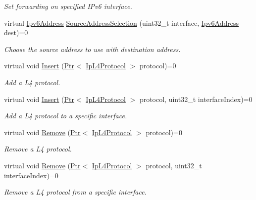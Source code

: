 \begin{DoxyCompactItemize}
\begin{DoxyCompactList}\small\item\em Set forwarding on specified I\+Pv6 interface. \end{DoxyCompactList}\item 
virtual \hyperlink{classns3_1_1Ipv6Address}{Ipv6\+Address} \hyperlink{classns3_1_1Ipv6_a07bfb23e4bee98b2a2bfb56c16908cd4}{Source\+Address\+Selection} (uint32\+\_\+t interface, \hyperlink{classns3_1_1Ipv6Address}{Ipv6\+Address} dest)=0
\begin{DoxyCompactList}\small\item\em Choose the source address to use with destination address. \end{DoxyCompactList}\item 
virtual void \hyperlink{classns3_1_1Ipv6_af696a13faee7772aa155e6b06a752220}{Insert} (\hyperlink{classns3_1_1Ptr}{Ptr}$<$ \hyperlink{classns3_1_1IpL4Protocol}{Ip\+L4\+Protocol} $>$ protocol)=0
\begin{DoxyCompactList}\small\item\em Add a L4 protocol. \end{DoxyCompactList}\item 
virtual void \hyperlink{classns3_1_1Ipv6_abac82ab5421240d8011131f0f49a080b}{Insert} (\hyperlink{classns3_1_1Ptr}{Ptr}$<$ \hyperlink{classns3_1_1IpL4Protocol}{Ip\+L4\+Protocol} $>$ protocol, uint32\+\_\+t interface\+Index)=0
\begin{DoxyCompactList}\small\item\em Add a L4 protocol to a specific interface. \end{DoxyCompactList}\item 
virtual void \hyperlink{classns3_1_1Ipv6_abb09312c165a45923cd88061a3be2c82}{Remove} (\hyperlink{classns3_1_1Ptr}{Ptr}$<$ \hyperlink{classns3_1_1IpL4Protocol}{Ip\+L4\+Protocol} $>$ protocol)=0
\begin{DoxyCompactList}\small\item\em Remove a L4 protocol. \end{DoxyCompactList}\item 
virtual void \hyperlink{classns3_1_1Ipv6_ac8f460ea4a38988cbc80b91a14e45912}{Remove} (\hyperlink{classns3_1_1Ptr}{Ptr}$<$ \hyperlink{classns3_1_1IpL4Protocol}{Ip\+L4\+Protocol} $>$ protocol, uint32\+\_\+t interface\+Index)=0
\begin{DoxyCompactList}\small\item\em Remove a L4 protocol from a specific interface. \end{DoxyCompactList}\item 

\end{DoxyCompactItemize}
